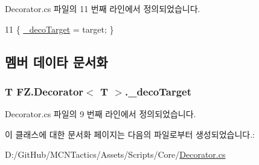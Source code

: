Decorator.\+cs 파일의 11 번째 라인에서 정의되었습니다.


\begin{DoxyCode}
11 \{ \hyperlink{class_f_z_1_1_decorator_adce2c6d288dcfa08b899f3e233190210}{\_decoTarget} = target; \}
\end{DoxyCode}


\subsection{멤버 데이타 문서화}
\subsubsection[{\texorpdfstring{\+\_\+deco\+Target}{_decoTarget}}]{\setlength{\rightskip}{0pt plus 5cm}T {\bf F\+Z.\+Decorator}$<$ T $>$.\+\_\+deco\+Target\hspace{0.3cm}{\ttfamily [protected]}}\hypertarget{class_f_z_1_1_decorator_adce2c6d288dcfa08b899f3e233190210}{}\label{class_f_z_1_1_decorator_adce2c6d288dcfa08b899f3e233190210}


Decorator.\+cs 파일의 9 번째 라인에서 정의되었습니다.



이 클래스에 대한 문서화 페이지는 다음의 파일로부터 생성되었습니다.\+:\begin{DoxyCompactItemize}
\item 
D\+:/\+Git\+Hub/\+M\+C\+N\+Tactics/\+Assets/\+Scripts/\+Core/\hyperlink{_decorator_8cs}{Decorator.\+cs}\end{DoxyCompactItemize}
